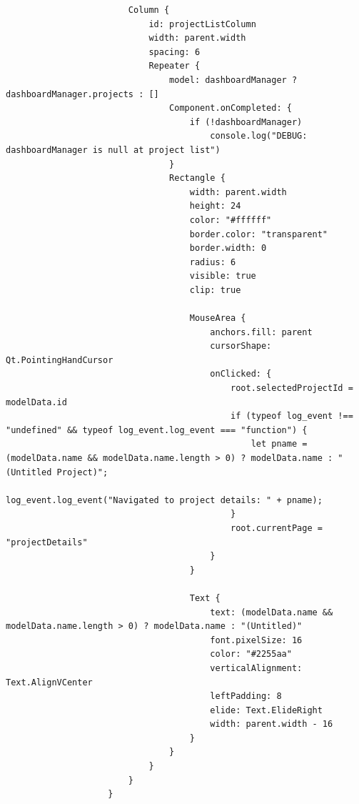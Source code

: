 \documentclass{report}
\begin{document}
\begin{lstlisting}
                        Column {
                            id: projectListColumn
                            width: parent.width
                            spacing: 6
                            Repeater {
                                model: dashboardManager ? dashboardManager.projects : []
                                Component.onCompleted: {
                                    if (!dashboardManager)
                                        console.log("DEBUG: dashboardManager is null at project list")
                                }
                                Rectangle {
                                    width: parent.width
                                    height: 24
                                    color: "#ffffff"
                                    border.color: "transparent"
                                    border.width: 0
                                    radius: 6
                                    visible: true
                                    clip: true
        
                                    MouseArea {
                                        anchors.fill: parent
                                        cursorShape: Qt.PointingHandCursor
                                        onClicked: {
                                            root.selectedProjectId = modelData.id
                                            if (typeof log_event !== "undefined" && typeof log_event.log_event === "function") {
                                                let pname = (modelData.name && modelData.name.length > 0) ? modelData.name : "(Untitled Project)";
                                                log_event.log_event("Navigated to project details: " + pname);
                                            }
                                            root.currentPage = "projectDetails"
                                        }
                                    }
        
                                    Text {
                                        text: (modelData.name && modelData.name.length > 0) ? modelData.name : "(Untitled)"
                                        font.pixelSize: 16
                                        color: "#2255aa"
                                        verticalAlignment: Text.AlignVCenter
                                        leftPadding: 8
                                        elide: Text.ElideRight
                                        width: parent.width - 16
                                    }
                                }
                            }
                        }
                    }


\end{lstlisting}
\end{document}
